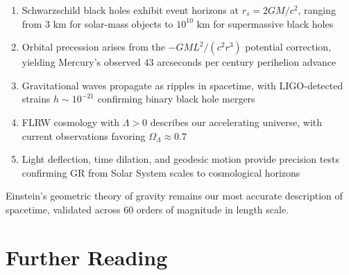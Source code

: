 \documentclass[a4paper, 11pt]{article}
\begin{document}
\begin{enumerate}
\item Schwarzschild black holes exhibit event horizons at $r_s = 2GM/c^2$, ranging from 3 km for
solar-mass objects to $10^{10}$ km for supermassive black holes
\item Orbital precession arises from the $-GML^2/(c^2r^3)$ potential correction, yielding
Mercury's observed 43 arcseconds per century perihelion advance
\item Gravitational waves propagate as ripples in spacetime, with LIGO-detected strains
$h \sim 10^{-21}$ confirming binary black hole mergers
\item FLRW cosmology with $\Lambda > 0$ describes our accelerating universe, with current
observations favoring $\Omega_\Lambda \approx 0.7$
\item Light deflection, time dilation, and geodesic motion provide precision tests confirming
GR from Solar System scales to cosmological horizons
\end{enumerate}

Einstein's geometric theory of gravity remains our most accurate description of spacetime,
validated across 60 orders of magnitude in length scale.

\section*{Further Reading}
\end{document}
